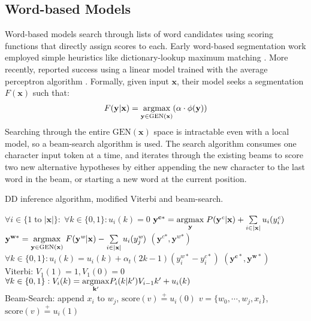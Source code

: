 \subsection{Word-based Models}
Word-based models search through lists of word candidates using scoring functions that directly assign scores to each. 
Early word-based segmentation work employed simple heuristics like dictionary-lookup maximum matching \cite{Chen:1992:ACL}. 
More recently,  reported success using a linear model trained with the average perceptron algorithm \cite{Collins:2002:EMNLP}.
 Formally, given input $\mathbf{x}$, their model seeks a segmentation $F(\mathbf{x})$ such that:
\begin{align*}
F(\mathbf{y}|\mathbf{x}) =  \underset{\mathbf{y} \in \mathrm{GEN}(\mathbf{x})}{\operatorname{argmax}}{ \left( \alpha \cdot \phi(\mathbf{\mathbf{y}}) \right) }
\end{align*}
\noindent Searching through the entire $\mathrm{GEN}(\mathbf{x})$ space is intractable even with a local model, so a beam-search algorithm is used. The search algorithm consumes one character input token at a time, and iterates through the existing beams to score two new alternative hypotheses by either appending the new character to the last word in the beam, or starting a new word at the current position.

\begin{algorithm}[!ht]
\begin{footnotesize}
\caption{DD inference algorithm, modified Viterbi and beam-search.}
\begin{algorithmic}
\STATE $\forall i \in \{1\; \mathrm{to} \; |\mathbf{x}|\} \colon \; \forall k \in \{0,1\} \colon u_{i}(k) = 0$
\STATE   $\mathbf{y^{c*}} = \underset{\mathbf{y}}{\operatorname{argmax}} \; P(\mathbf{y^\textit{c}} | \mathbf{x}) +  \sum\limits_{i\in |\mathbf{x}|}{u_{i}(y_i^\textit{c})}$ 
\STATE   $\mathbf{y^{w*}} = \underset{\mathbf{y} \in \mathrm{GEN}(\mathbf{x})}{\operatorname{argmax}} \; F(\mathbf{y^\textit{w}} | \mathbf{x}) -  \sum\limits_{i\in |\mathbf{x}|}{ u_{i}(y_j^\textit{w})}$
\RETURN $\left(\mathbf{y^{\textit{c}*}},\mathbf{y^{\textit{w}*}}\right)$
\ENDIF
{}
\STATE  $\forall k \in \{0,1\}: u_i(k)=u_i(k) + \alpha_t (2k-1)(y_i^{w*}-y_i^{c*})$ 
\ENDFOR
\ENDFOR
\RETURN $\left(\mathbf{y^{c*}},\mathbf{y^{w*}}\right)$
 \\\hrulefill
\STATE Viterbi: 
\STATE $V_1(1) = 1, V_1(0) = 0$
\STATE $\forall k \in \{0,1\}: V_i(k) = \underset{\mathbf{k'}}{\operatorname{argmax}} P_i(k | k') V_{i-1}{k'} + u_{i}(k)$ 
\ENDFOR
 \\\hrulefill
\STATE Beam-Search:
\STATE append $x_i$ to $w_j$, $\mathrm{score}(v) \stackrel{+}{=}   u_{i}(0)$
\STATE $v = \{w_0,\cdots,w_j, x_i\}$, $\mathrm{score}(v) \stackrel{+}{=} u_{i}(1)$
\ENDFOR
\ENDFOR
\end{algorithmic}
\label{algo:DD}
\end{footnotesize}
\end{algorithm}


